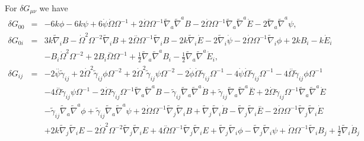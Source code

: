 \documentclass[aps,onecolumn,10pt]{revtex4}
\numberwithin{equation}{section}
\numberwithin{equation}{section}
\begin{document}
For $\delta G_{\mu\nu}$ we have
%
\begin{eqnarray}
\delta G_{00}&=& -6 k \phi - 6 k \psi + 6 \dot{\psi} \dot{\Omega} \Omega^{-1} + 2 \dot{\Omega} \Omega^{-1} \tilde{\nabla}_{a}\tilde{\nabla}^{a}B - 2 \dot{\Omega} \Omega^{-1} \tilde{\nabla}_{a}\tilde{\nabla}^{a}\dot{E} - 2 \tilde{\nabla}_{a}\tilde{\nabla}^{a}\psi, 
 \nonumber\\ 
\delta G_{0i}&=& 3 k \tilde{\nabla}_{i}B -  \dot{\Omega}^2 \Omega^{-2} \tilde{\nabla}_{i}B + 2 \overset{..}{\Omega} \Omega^{-1} \tilde{\nabla}_{i}B - 2 k \tilde{\nabla}_{i}\dot{E} - 2 \tilde{\nabla}_{i}\dot{\psi} - 2 \dot{\Omega} \Omega^{-1} \tilde{\nabla}_{i}\phi +2 k B_{i} -  k \dot{E}_{i} \nonumber \\ 
&& -  B_{i} \dot{\Omega}^2 \Omega^{-2} + 2 B_{i} \overset{..}{\Omega} \Omega^{-1} + \tfrac{1}{2} \tilde{\nabla}_{a}\tilde{\nabla}^{a}B_{i} -  \tfrac{1}{2} \tilde{\nabla}_{a}\tilde{\nabla}^{a}\dot{E}_{i},
 \nonumber\\ 
\delta G_{ij}&=& -2 \overset{..}{\psi}\tilde{\gamma}_{ij} + 2 \dot{\Omega}^2\tilde{\gamma}_{ij} \phi \Omega^{-2} + 2 \dot{\Omega}^2\tilde{\gamma}_{ij} \psi \Omega^{-2} - 2 \dot{\phi} \dot{\Omega}\tilde{\gamma}_{ij} \Omega^{-1} - 4 \dot{\psi} \dot{\Omega}\tilde{\gamma}_{ij} \Omega^{-1} - 4 \overset{..}{\Omega}\tilde{\gamma}_{ij} \phi \Omega^{-1} \nonumber \\ 
&& - 4 \overset{..}{\Omega}\tilde{\gamma}_{ij} \psi \Omega^{-1} - 2 \dot{\Omega}\tilde{\gamma}_{ij} \Omega^{-1} \tilde{\nabla}_{a}\tilde{\nabla}^{a}B - \tilde{\gamma}_{ij} \tilde{\nabla}_{a}\tilde{\nabla}^{a}\dot{B} +\tilde{\gamma}_{ij} \tilde{\nabla}_{a}\tilde{\nabla}^{a}\overset{..}{E} + 2 \dot{\Omega}\tilde{\gamma}_{ij} \Omega^{-1} \tilde{\nabla}_{a}\tilde{\nabla}^{a}\dot{E} 
\nonumber \\ 
&& - \tilde{\gamma}_{ij} \tilde{\nabla}_{a}\tilde{\nabla}^{a}\phi +\tilde{\gamma}_{ij} \tilde{\nabla}_{a}\tilde{\nabla}^{a}\psi + 2 \dot{\Omega} \Omega^{-1} \tilde{\nabla}_{j}\tilde{\nabla}_{i}B + \tilde{\nabla}_{j}\tilde{\nabla}_{i}\dot{B} -  \tilde{\nabla}_{j}\tilde{\nabla}_{i}\overset{..}{E} - 2 \dot{\Omega} \Omega^{-1} \tilde{\nabla}_{j}\tilde{\nabla}_{i}\dot{E} \nonumber \\ 
&& + 2 k \tilde{\nabla}_{j}\tilde{\nabla}_{i}E - 2 \dot{\Omega}^2 \Omega^{-2} \tilde{\nabla}_{j}\tilde{\nabla}_{i}E + 4 \overset{..}{\Omega} \Omega^{-1} \tilde{\nabla}_{j}\tilde{\nabla}_{i}E + \tilde{\nabla}_{j}\tilde{\nabla}_{i}\phi -  \tilde{\nabla}_{j}\tilde{\nabla}_{i}\psi +\dot{\Omega} \Omega^{-1} \tilde{\nabla}_{i}B_{j} + \tfrac{1}{2} \tilde{\nabla}_{i}\dot{B}_{j}

\end{eqnarray}
\end{document}
